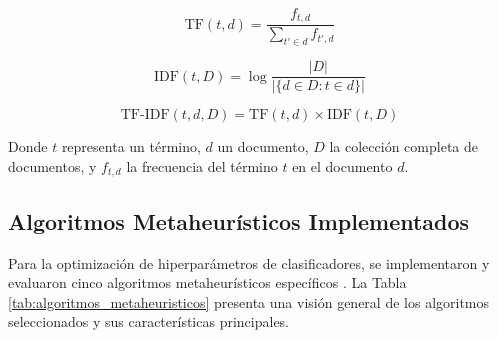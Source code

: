 \begin{equation}
\text{TF}(t,d) = \frac{f_{t,d}}{\sum_{t' \in d} f_{t',d}}
\end{equation}

\begin{equation}
\text{IDF}(t,D) = \log\frac{|D|}{|\{d \in D : t \in d\}|}
\end{equation}

\begin{equation}
\text{TF-IDF}(t,d,D) = \text{TF}(t,d) \times \text{IDF}(t,D)
\end{equation}

Donde $t$ representa un término, $d$ un documento, $D$ la colección completa de documentos, y $f_{t,d}$ la frecuencia del término $t$ en el documento $d$.

\subsection{Algoritmos Metaheurísticos Implementados}

Para la optimización de hiperparámetros de clasificadores, se implementaron y evaluaron cinco algoritmos metaheurísticos específicos \cite{hurtado2024calibracion, bacanin2023benefits}. La Tabla \ref{tab:algoritmos_metaheuristicos} presenta una visión general de los algoritmos seleccionados y sus características principales.

